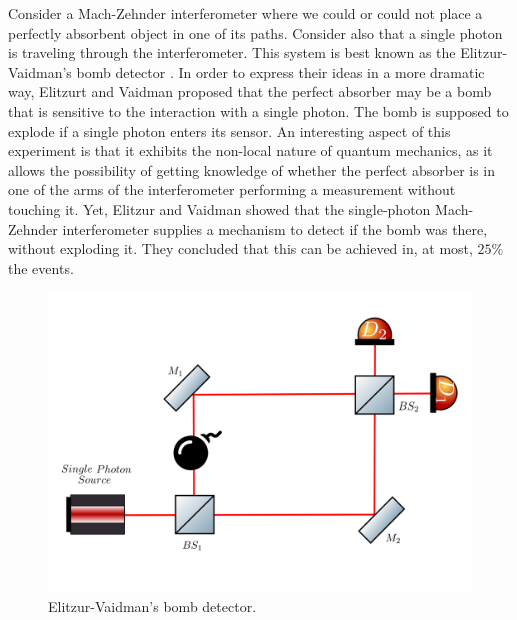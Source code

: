 \documentclass[12pt]{book}
\begin{document}
Consider a Mach-Zehnder interferometer where we could or could not place a perfectly absorbent object in one of its paths. Consider also that a single photon is traveling through the interferometer. This system is best known as the Elitzur-Vaidman's bomb detector \cite{Elitzur}. In order to express their ideas in a more dramatic way, Elitzurt and Vaidman proposed that the perfect absorber may be a bomb that is sensitive to the interaction with a single photon. The bomb is supposed to explode if  a single photon enters its sensor. An interesting aspect of this experiment is that it exhibits the non-local nature of quantum mechanics, as it allows the possibility of getting knowledge of whether the perfect absorber is in one of the arms of the interferometer performing a measurement without touching it. Yet, Elitzur and Vaidman showed that the single-photon Mach-Zehnder interferometer supplies a mechanism to detect if the bomb was there, without exploding it. They concluded that this can be achieved in, at most, $25\%$ the events.


\begin{figure}[t!]
\centering
\includegraphics[width=\linewidth]{images/machzenhderbomb.png}
\caption{Elitzur-Vaidman's bomb detector.}
\label{fig:bomb}
\end{figure}
\end{document}
